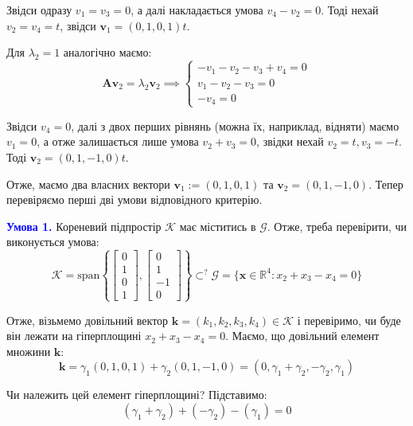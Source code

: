 \documentclass[oneside,solution]{karazin-control-assign}
\begin{document}
Звідси одразу $v_1=v_3=0$, а далі накладається умова $v_4-v_2=0$. Тоді нехай $v_2=v_4=t$, звідси $\mathbf{v}_1=(0,1,0,1)t$. 

Для $\lambda_2=1$ аналогічно маємо:
\begin{equation}
    \boldsymbol{A}\mathbf{v}_2 = \lambda_2\mathbf{v}_2 \implies \begin{cases}
        -v_1-v_2-v_3+v_4 = 0 \\
        v_1 - v_2 - v_3 = 0 \\
        -v_4 = 0
    \end{cases}
\end{equation}

Звідси $v_4=0$, далі з двох перших рівнянь (можна їх, наприклад, відняти) маємо $v_1=0$, а отже залишається лише умова $v_2+v_3=0$, звідки нехай $v_2=t,v_3=-t$. Тоді $\mathbf{v}_2=(0,1,-1,0)t$. 

Отже, маємо два власних вектори $\mathbf{v}_1:=(0,1,0,1)$ та $\mathbf{v}_2=(0,1,-1,0)$. Тепер перевіряємо перші дві умови відповідного критерію. 

\textcolor{blue}{\textbf{Умова 1.}} Кореневий підпростір $\mathcal{K}$ має міститись в $\mathcal{G}$. Отже, треба перевірити, чи виконується умова:
\begin{equation}
    \mathcal{K} = \text{span}\left\{\begin{bmatrix}
        0 \\ 1 \\ 0 \\ 1
    \end{bmatrix}, \begin{bmatrix}
        0 \\ 1 \\ -1 \\ 0
    \end{bmatrix}\right\} \subset^? \mathcal{G} = \{\mathbf{x} \in \mathbb{R}^4: x_2+x_3-x_4=0\}
\end{equation}

Отже, візьмемо довільний вектор $\mathbf{k}=(k_1,k_2,k_3,k_4) \in \mathcal{K}$ і перевіримо, чи буде він лежати на гіперплощині $x_2+x_3-x_4=0$. Маємо, що довільний елемент множини $\mathbf{k}$:
\begin{equation}
    \mathbf{k} = \gamma_1(0,1,0,1) + \gamma_2(0,1,-1,0) = (0,\gamma_1+\gamma_2,-\gamma_2,\gamma_1)
\end{equation}

Чи належить цей елемент гіперплощині? Підставимо:
\begin{equation}
    (\gamma_1+\gamma_2) + (-\gamma_2) - (\gamma_1) = 0
\end{equation}
\end{document}

